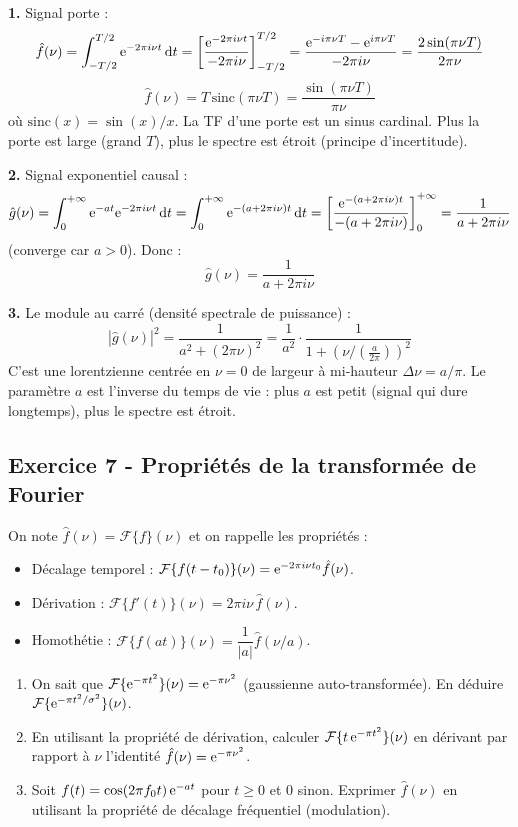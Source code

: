 \documentclass[12pt,a4paper]{article}
\begin{document}
\begin{boitecorrige}
\textbf{1.} Signal porte :
\[
\hat{f}(\nu) = \int_{-T/2}^{T/2} \mathrm{e}^{-2\pi i\nu t}\,\mathrm{d} t = \left[\frac{\mathrm{e}^{-2\pi i\nu t}}{-2\pi i\nu}\right]_{-T/2}^{T/2} = \frac{\mathrm{e}^{-i\pi\nu T} - \mathrm{e}^{i\pi\nu T}}{-2\pi i\nu} = \frac{2\sin(\pi\nu T)}{2\pi\nu}
\]
\[
\boxed{\hat{f}(\nu) = T\,\mathrm{sinc}(\pi\nu T) = \frac{\sin(\pi\nu T)}{\pi\nu}}
\]
où $\mathrm{sinc}(x) = \sin(x)/x$. La TF d'une porte est un sinus cardinal. Plus la porte est large (grand $T$), plus le spectre est étroit (principe d'incertitude).

\textbf{2.} Signal exponentiel causal :
\[
\hat{g}(\nu) = \int_0^{+\infty}\mathrm{e}^{-at}\mathrm{e}^{-2\pi i\nu t}\,\mathrm{d} t = \int_0^{+\infty}\mathrm{e}^{-(a+2\pi i\nu)t}\,\mathrm{d} t = \left[\frac{\mathrm{e}^{-(a+2\pi i\nu)t}}{-(a+2\pi i\nu)}\right]_0^{+\infty} = \frac{1}{a+2\pi i\nu}
\]
(converge car $a > 0$). Donc :
\[
\boxed{\hat{g}(\nu) = \frac{1}{a+2\pi i\nu}}
\]

\textbf{3.} Le module au carré (densité spectrale de puissance) :
\[
|\hat{g}(\nu)|^2 = \frac{1}{a^2+(2\pi\nu)^2} = \frac{1}{a^2}\cdot\frac{1}{1+(\nu/(\frac{a}{2\pi}))^2}
\]
C'est une lorentzienne centrée en $\nu = 0$ de largeur à mi-hauteur $\Delta\nu = a/\pi$. Le paramètre $a$ est l'inverse du temps de vie : plus $a$ est petit (signal qui dure longtemps), plus le spectre est étroit.
\end{boitecorrige}

\subsection*{Exercice 7 - Propriétés de la transformée de Fourier \niveau{\moyen}}

\begin{boiteexercice}
On note $\hat{f}(\nu) = \mathcal{F}\{f\}(\nu)$ et on rappelle les propriétés :
\begin{itemize}[nosep]
  \item Décalage temporel : $\mathcal{F}\{f(t-t_0)\}(\nu) = \mathrm{e}^{-2\pi i\nu t_0}\hat{f}(\nu)$.
  \item Dérivation : $\mathcal{F}\{f'(t)\}(\nu) = 2\pi i\nu\,\hat{f}(\nu)$.
  \item Homothétie : $\mathcal{F}\{f(at)\}(\nu) = \dfrac{1}{|a|}\hat{f}(\nu/a)$.
\end{itemize}
\begin{enumerate}
  \item On sait que $\mathcal{F}\{\mathrm{e}^{-\pi t^2}\}(\nu) = \mathrm{e}^{-\pi\nu^2}$ (gaussienne auto-transformée). En déduire $\mathcal{F}\{\mathrm{e}^{-\pi t^2/\sigma^2}\}(\nu)$.
  \item En utilisant la propriété de dérivation, calculer $\mathcal{F}\{t\,\mathrm{e}^{-\pi t^2}\}(\nu)$ en dérivant par rapport à $\nu$ l'identité $\hat{f}(\nu) = \mathrm{e}^{-\pi\nu^2}$.
  \item Soit $f(t) = \cos(2\pi f_0 t)\,\mathrm{e}^{-at}$ pour $t\geq0$ et 0 sinon. Exprimer $\hat{f}(\nu)$ en utilisant la propriété de décalage fréquentiel (modulation).
\end{enumerate}
\end{boiteexercice}
\end{document}
